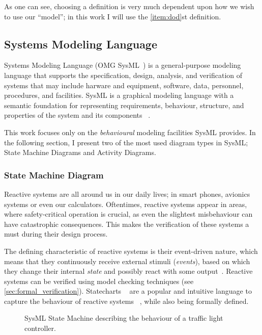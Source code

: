 As one can see, choosing a definition is very much dependent upon how we wish to use our ``model''; in this work I will use the \ref{item:dod}st definition.

\subsection{Systems Modeling Language}\label{ssec:sysml}

Systems Modeling Language (OMG SysML~\cite{omg_sysml}) is a general-purpose modeling language that supports the specification, design, analysis, and verification of systems that may include harware and equipment, software, data, personnel, procedures, and facilities. SysML is a graphical modeling language with a semantic foundation for representing requirements, behaviour, structure, and properties of the system and its components ~\cite{sysml_practical_guide}.

This work focuses only on the \emph{behavioural} modeling facilities SysML provides. In the following section, I present two of the most used diagram types in SysML; State Machine Diagrams and Activity Diagrams.

\subsubsection*{State Machine Diagram}

Reactive systems are all around us in our daily lives; in smart phones, avionics systems or even our calculators. Oftentimes, reactive systems appear in areas, where safety-critical operation is crucial, as even the slightest misbehaviour can have catastrophic consequences. This makes the verification of these systems a must during their design process.

The defining characteristic of reactive systems is their event-driven nature, which means that they continuously receive external stimuli (\emph{events}), based on which they change their internal \emph{state} and possibly react with some output~\cite{10.1007/978-3-642-82453-1_17}. Reactive systems can be verified using model checking techniques (see \autoref{sec:formal_verification}). Statecharts ~\cite{HAREL1987231} are a popular and intuitive language to capture the behaviour of reactive systems ~\cite{10.1145/3417990.3421407, 10.1007/978-3-319-11653-2_10}, while also being formally defined.

\begin{figure}[!ht]
	\centering
	
	\caption{SysML State Machine describing the behaviour of a traffic light controller.}
	\label{fig:sysml_state_machine}
\end{figure}

